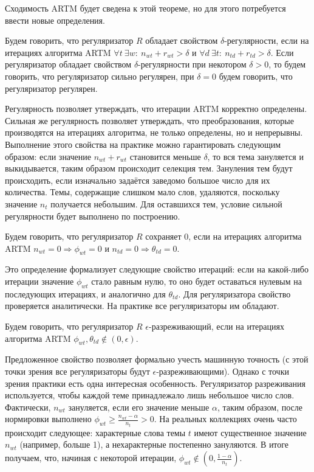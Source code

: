 \documentclass[12pt, twoside]{article}
\begin{document}
Сходимость ARTM будет сведена к этой теореме, но для этого потребуется ввести новые определения.

\begin{Definition}
\label{strongreg}
Будем говорить, что регуляризатор $ R$ обладает свойством $\delta$-регулярности, если на итерациях алгоритма ARTM $\forall t~\exists w \colon~n_{wt} + r_{wt} > \delta$ и $\forall d~\exists t \colon~n_{td} + r_{td} > \delta$. Если регуляризатор  обладает свойством $\delta$-регулярности при некотором $\delta > 0$, то будем говорить, что регуляризатор сильно регулярен, при $\delta=0$ будем говорить, что регуляризатор регулярен.
\end{Definition}

Регулярность позволяет утверждать, что итерации ARTM корректно определены. Сильная же регулярность позволяет утверждать, что преобразования, которые производятся на итерациях алгоритма, не только определены, но и непрерывны. Выполнение этого свойства на практике  можно гарантировать следующим образом: если значение $n_{wt} + r_{wt}$ становится меньше $\delta$, то вся тема зануляется  и выкидывается, таким образом происходит селекция тем. Зануления тем будут происходить, если  изначально задаётся заведомо большое число для их количества. Темы, содержащие слишком мало слов, удаляются, поскольку значение $n_t$ получается небольшим. Для оставшихся тем, условие сильной регулярности будет выполнено по построению.
 
\begin{Definition}
Будем говорить, что регуляризатор $R$ сохраняет 0, если на итерациях алгоритма ARTM $n_{wt} = 0 \Rightarrow \phi_{wt} = 0$ и $n_{td} = 0 \Rightarrow \theta_{td} = 0$.
\end{Definition}

Это определение формализует следующие свойство итераций: если на какой-либо итерации значение $\phi_{wt}$ стало равным нулю, то оно будет оставаться нулевым на последующих итерациях, и аналогично для $\theta_{td}$. Для регуляризатора свойство проверяется аналитически. На практике все регуляризаторы им обладают.

\begin{Definition}
\label{sparsereg}
Будем говорить, что регуляризатор $ R$ $\epsilon$-разреживающий, если на итерациях алгоритма ARTM $\phi_{wt}, \theta_{td} \notin (0, \epsilon)$.
\end{Definition}

Предложенное свойство позволяет формально учесть машинную точность (с этой точки зрения все регуляризаторы будут $\epsilon$-разреживающими). Однако с точки зрения практики есть одна интересная особенность. Регуляризатор разреживания используется, чтобы каждой теме принадлежало лишь небольшое число слов. Фактически,  $n_{wt}$ зануляется, если его значение меньше $\alpha$, таким образом, после нормировки выполнено $\phi_{wt} \geq \frac{n_{wt} - \alpha}{n_t} > 0$.  На реальных коллекциях очень часто происходит следующее: характерные слова темы $t$ имеют существенное значение $n_{wt}$ (например, больше 1), а нехарактерные постепенно зануляются. В итоге получаем, что, начиная с некоторой итерации, $\phi_{wt} \notin (0, \frac{1-\alpha}{n_t})$.
\end{document}
